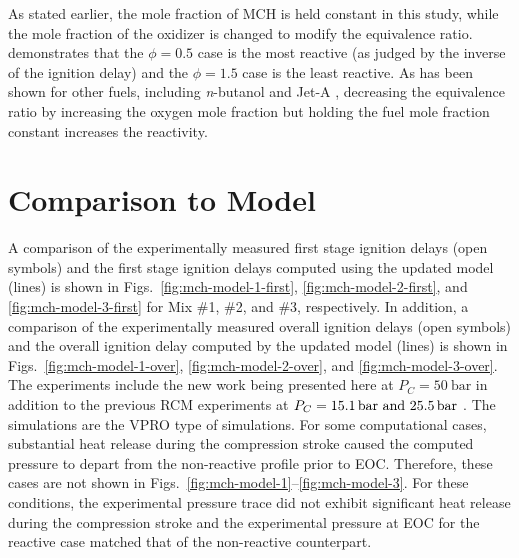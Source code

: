 \documentclass[12pt, letterpaper]{article}
\begin{document}
As stated earlier, the mole fraction of MCH is held constant in this study,
while the mole fraction of the oxidizer is changed to modify the equivalence
ratio.  demonstrates that the $\phi=\num{0.5}$ case is the most
reactive (as judged by the inverse of the ignition delay) and the $\phi=\num{1.5}$
case is the least reactive. As has been shown for other fuels, including
\textit{n}-butanol \cite{Weber2011} and Jet-A \cite{Kumar2010}, decreasing the
equivalence ratio by increasing the oxygen mole fraction but holding the fuel
mole fraction constant increases the reactivity.

\section{Comparison to Model}
\label{sec:model-comparison}

A comparison of the experimentally measured first stage ignition delays (open
symbols) and the first stage ignition delays computed using the updated model
(lines) is shown in Figs.~\ref{fig:mch-model-1-first}, \ref{fig:mch-model-2-first},
and \ref{fig:mch-model-3-first} for Mix \#1, \#2, and \#3, respectively. In
addition, a comparison of the experimentally measured overall ignition delays
(open symbols) and the overall ignition delay computed by the updated model
(lines) is shown in Figs.~\ref{fig:mch-model-1-over}, \ref{fig:mch-model-2-over},
and \ref{fig:mch-model-3-over}. The experiments include the new work being
presented here at $P_C=\SI{50}{\bar}$ in addition to the previous RCM experiments at
$P_C=\SIlist{15.1;25.5}{\bar}$ \cite{Mittal2009}. The simulations are the VPRO type
of simulations. For some computational cases, substantial heat release during
the compression stroke caused the computed pressure to depart from the
non-reactive profile prior to EOC. Therefore, these cases are not shown in
Figs.~\ref{fig:mch-model-1}--\ref{fig:mch-model-3}. For these conditions, the
experimental pressure trace did not exhibit significant heat release during
the compression stroke and the experimental pressure at EOC for the reactive
case matched that of the non-reactive counterpart.
\end{document}

